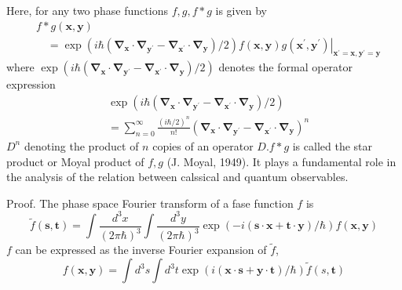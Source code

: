 \documentclass{article}
\begin{document}
Here, for any two phase functions $f, g, f * g$ is given by
$$
\begin{align*}
& f * g(\boldsymbol{x}, \boldsymbol{y})  \tag{3.7.32}\\
& \quad=\left.\exp \left(i \hbar\left(\boldsymbol{\nabla}_{\boldsymbol{x}} \cdot \boldsymbol{\nabla}_{\boldsymbol{y}^{\prime}}-\boldsymbol{\nabla}_{\boldsymbol{x}^{\prime}} \cdot \boldsymbol{\nabla}_{\boldsymbol{y}}\right) / 2\right) f(\boldsymbol{x}, \boldsymbol{y}) g\left(\boldsymbol{x}^{\prime}, \boldsymbol{y}^{\prime}\right)\right|_{\boldsymbol{x}^{\prime}=\boldsymbol{x}, \boldsymbol{y}^{\prime}=\boldsymbol{y}}
\end{align*}
$$
where $\exp \left(i \hbar\left(\boldsymbol{\nabla}_{\boldsymbol{x}} \cdot \boldsymbol{\nabla}_{\boldsymbol{y}^{\prime}}-\boldsymbol{\nabla}_{\boldsymbol{x}^{\prime}} \cdot \boldsymbol{\nabla}_{\boldsymbol{y}}\right) / 2\right)$ denotes the formal operator expression
$$
\begin{align*}
& \exp \left(i \hbar\left(\boldsymbol{\nabla}_{\boldsymbol{x}} \cdot \boldsymbol{\nabla}_{\boldsymbol{y}^{\prime}}-\boldsymbol{\nabla}_{\boldsymbol{x}^{\prime}} \cdot \boldsymbol{\nabla}_{\boldsymbol{y}}\right) / 2\right)  \tag{3.7.33}\\
&=\sum_{n=0}^{\infty} \frac{(i \hbar / 2)^{n}}{n!}\left(\boldsymbol{\nabla}_{\boldsymbol{x}} \cdot \boldsymbol{\nabla}_{\boldsymbol{y}^{\prime}}-\boldsymbol{\nabla}_{\boldsymbol{x}^{\prime}} \cdot \boldsymbol{\nabla}_{\boldsymbol{y}}\right)^{n}
\end{align*}
$$
$D^{n}$ denoting the product of $n$ copies of an operator $D . f * g$ is called the star product or Moyal product of $f, g$ (J. Moyal, 1949). It plays a fundamental role in the analysis of the relation between calssical and quantum observables.

Proof. The phase space Fourier transform of a fase function $f$ is
$$
\begin{equation*}
\tilde{f}(\boldsymbol{s}, \boldsymbol{t})=\int \frac{d^{3} x}{(2 \pi \hbar)^{3}} \int \frac{d^{3} y}{(2 \pi \hbar)^{3}} \exp (-i(\boldsymbol{s} \cdot \boldsymbol{x}+\boldsymbol{t} \cdot \boldsymbol{y}) / \hbar) f(\boldsymbol{x}, \boldsymbol{y}) \tag{3.7.34}
\end{equation*}
$$
$f$ can be expressed as the inverse Fourier expansion of $\tilde{f}$,
$$
\begin{equation*}
f(\boldsymbol{x}, \boldsymbol{y})=\int d^{3} s \int d^{3} t \exp (i(\boldsymbol{x} \cdot \boldsymbol{s}+\boldsymbol{y} \cdot \boldsymbol{t}) / \hbar) \tilde{f}(s, \boldsymbol{t}) \tag{3.7.35}
\end{equation*}
$$
\end{document}
